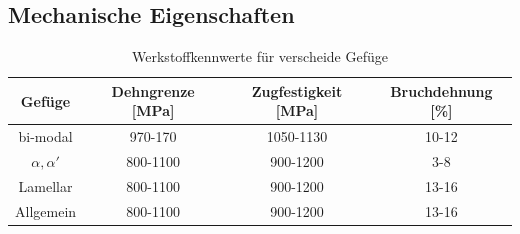 \documentclass[a4paper, 11pt]{tubsreprt}
\begin{document}
\subsection{Mechanische Eigenschaften}
\begin{table}
\begin{tabular}{c|c|c|c}
Gefüge & Dehngrenze [MPa] & Zugfestigkeit [MPa] & Bruchdehnung [\%] \\
\hline
bi-modal &	970-170 & 1050-1130 & 10-12 \\
\hline
{$\alpha, \alpha'$} & 800-1100 & 900-1200 & 3-8 \\
\hline
Lamellar & 800-1100 & 900-1200 & 13-16 \\
\hline
Allgemein & 800-1100 & 900-1200 & 13-16 \\

\end{tabular}

\caption[Werkstoffkennwerte für verschiedene Gefüge]{Werkstoffkennwerte für verscheide Gefüge \cite{Chen2008} \cite{Sieniawski2013} \cite{Lee2005}}
\label{Tabelle Spannungen Gefüge}
\end{table}
\end{document}

